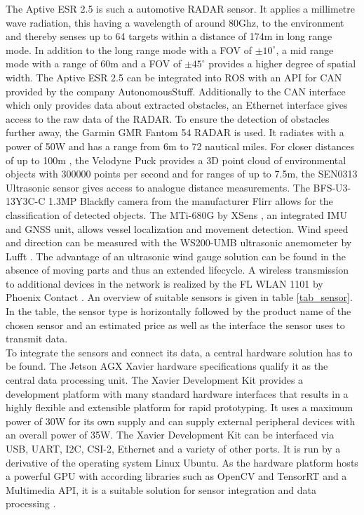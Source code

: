 The Aptive ESR 2.5 \cite{AptivESR} is such a automotive \ac{RADAR} sensor. It applies a millimetre wave radiation, this having a wavelength of around 80Ghz, to the environment and thereby senses up to 64 targets within a distance of 174m in long range mode. In addition to the long range mode with a \ac{FOV} of $\pm10^{\circ}$, a mid range mode with a range of 60m and a \ac{FOV} of $\pm45^{\circ}$ provides a higher degree of spatial width. The Aptive ESR 2.5 can be integrated into \ac{ROS} with an \ac{API} for \ac{CAN} provided by the company AutonomousStuff. Additionally to the \ac{CAN} interface which only provides data about extracted obstacles, an Ethernet interface gives access to the raw data of the \ac{RADAR}. To ensure the detection of obstacles further away, the Garmin GMR Fantom 54 \ac{RADAR} is used. It radiates with a power of 50W and has a range from 6m to 72 nautical miles. For closer distances of up to 100m , the Velodyne Puck \cite{VelodynePuck} provides a 3D point cloud of environmental objects with 300000 points per second and for ranges of up to 7.5m, the SEN0313 Ultrasonic sensor \cite{UltrasonicA01} gives access to analogue distance measurements. The BFS-U3-13Y3C-C 1.3MP Blackfly camera from the manufacturer Flirr \cite{Blackfly} allows for the classification of detected objects. The MTi-680G by XSens \cite{XSens}, an integrated \ac{IMU} and \ac{GNSS} unit, allows vessel localization and movement detection. Wind speed and direction can be measured with the WS200-UMB ultrasonic anemometer by Lufft \cite{Lufft}. The advantage of an ultrasonic wind gauge solution can be found in the absence of moving parts and thus an extended lifecycle. A wireless transmission to additional devices in the network is realized by the FL WLAN 1101 by Phoenix Contact \cite{Phoenix_WLAN}. An overview of suitable sensors is given in table \ref{tab_sensor}. In the table, the sensor type is horizontally followed by the product name of the chosen sensor and an estimated price as well as the interface the sensor uses to transmit data.\\

To integrate the sensors and connect its data, a central hardware solution has to be found. The Jetson AGX Xavier hardware specifications qualify it as the central data processing unit. The Xavier Development Kit provides a development platform with many standard hardware interfaces that results in a highly flexible and extensible platform for rapid prototyping. It uses a maximum power of 30W for its own supply and can supply external peripheral devices with an overall power of 35W. The Xavier Development Kit can be interfaced via USB, UART, I2C, CSI-2, Ethernet and a variety of other ports. It is run by a derivative of the operating system Linux Ubuntu. As the hardware platform hosts a powerful \ac{GPU} with according libraries such as OpenCV and TensorRT and a Multimedia \ac{API}, it is a suitable solution for sensor integration and data processing \cite{Xavier}.

